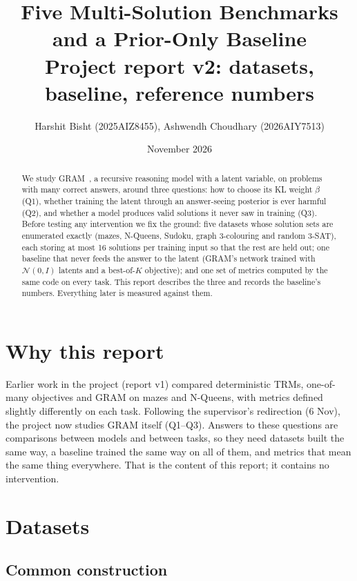 \documentclass[11pt]{article}
\title{Five Multi-Solution Benchmarks and a Prior-Only Baseline\\[4pt]
\large Project report v2: datasets, baseline, reference numbers}
\author{Harshit Bisht (2025AIZ8455), Ashwendh Choudhary (2026AIY7513)}
\date{November 2026}
\begin{document}
\maketitle

\begin{abstract}
We study GRAM~\cite{baek2026gram}, a recursive reasoning model with a latent variable, on problems with many correct
answers, around three questions: how to choose its KL weight $\beta$ (Q1), whether training the latent through an
answer-seeing posterior is ever harmful (Q2), and whether a model produces valid solutions it never saw in training
(Q3). Before testing any intervention we fix the ground: five datasets whose solution sets are enumerated exactly
(mazes, N-Queens, Sudoku, graph 3-colouring and random 3-SAT), each storing at most 16 solutions per training input so
that the rest are held out; one baseline that never feeds the answer to the latent (GRAM's network trained with
$\mathcal{N}(0,I)$ latents and a best-of-$K$ objective); and one set of metrics computed by the same code on every
task. This report describes the three and records the baseline's numbers. Everything later is measured against
them.
\end{abstract}

\section{Why this report}

Earlier work in the project (report v1) compared deterministic TRMs, one-of-many objectives and GRAM on mazes and
N-Queens, with metrics defined slightly differently on each task. Following the supervisor's redirection (6 Nov), the
project now studies GRAM itself (Q1--Q3). Answers to these questions are comparisons between models and between
tasks, so they need datasets built the same way, a baseline trained the same way on all of them, and metrics that
mean the same thing everywhere. That is the content of this report; it contains no intervention.

\section{Datasets}

\subsection{Common construction}
\end{document}
